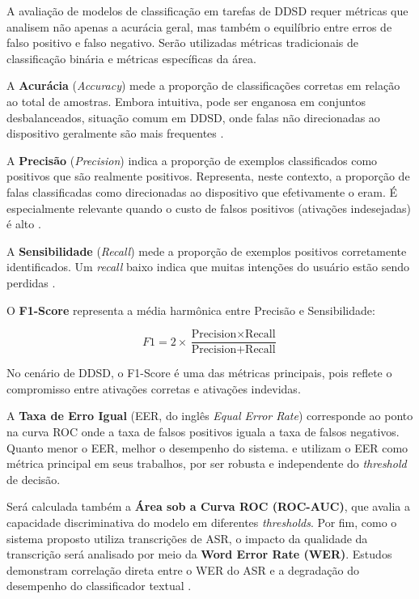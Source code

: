 \documentclass[
    12pt,                %
    openright,           %
    oneside,             %
    a4paper,             %
    english,             %
    brazil               %
]{abntex2}
\begin{document}
A avaliação de modelos de classificação em tarefas de DDSD requer métricas que analisem não apenas a acurácia geral, mas também o equilíbrio entre erros de falso positivo e falso negativo. Serão utilizadas métricas tradicionais de classificação binária e métricas específicas da área.

A \textbf{Acurácia} (\textit{Accuracy}) mede a proporção de classificações corretas em relação ao total de amostras. Embora intuitiva, pode ser enganosa em conjuntos desbalanceados, situação comum em DDSD, onde falas não direcionadas ao dispositivo geralmente são mais frequentes \cite{Manning2008}.

A \textbf{Precisão} (\textit{Precision}) indica a proporção de exemplos classificados como positivos que são realmente positivos. Representa, neste contexto, a proporção de falas classificadas como direcionadas ao dispositivo que efetivamente o eram. É especialmente relevante quando o custo de falsos positivos (ativações indesejadas) é alto \cite{Weld2022}.

A \textbf{Sensibilidade} (\textit{Recall}) mede a proporção de exemplos positivos corretamente identificados. Um \textit{recall} baixo indica que muitas intenções do usuário estão sendo perdidas \cite{Weld2022}.

O \textbf{F1-Score} representa a média harmônica entre Precisão e Sensibilidade:

\[
F1 = 2 \times \frac{\text{Precision} \times \text{Recall}}{\text{Precision} + \text{Recall}}
\]

No cenário de DDSD, o F1-Score é uma das métricas principais, pois reflete o compromisso entre ativações corretas e ativações indevidas.

A \textbf{Taxa de Erro Igual} (EER, do inglês \textit{Equal Error Rate}) corresponde ao ponto na curva ROC onde a taxa de falsos positivos iguala a taxa de falsos negativos. Quanto menor o EER, melhor o desempenho do sistema.  e  utilizam o EER como métrica principal em seus trabalhos, por ser robusta e independente do \textit{threshold} de decisão.

Será calculada também a \textbf{Área sob a Curva ROC (ROC-AUC)}, que avalia a capacidade discriminativa do modelo em diferentes \textit{thresholds}. Por fim, como o sistema proposto utiliza transcrições de ASR, o impacto da qualidade da transcrição será analisado por meio da \textbf{Word Error Rate (WER)}. Estudos demonstram correlação direta entre o WER do ASR e a degradação do desempenho do classificador textual \cite{Dighe2024}.
\end{document}
